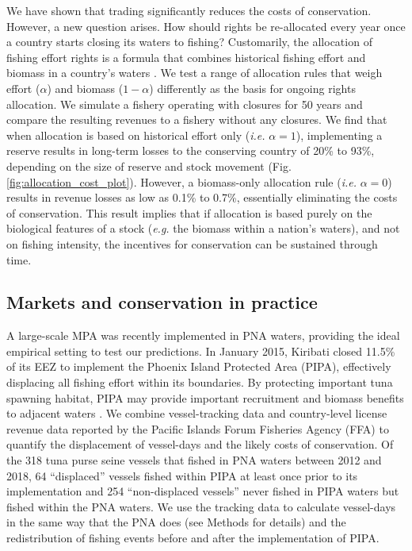 \documentclass[12pt]{article}
\begin{document}
We have shown that trading significantly reduces the costs of conservation. However, a new question arises. How should rights be re-allocated every year once a country starts closing its waters to fishing? Customarily, the allocation of fishing effort rights is a formula that combines historical fishing effort and biomass in a country's waters \cite{havice_2013}. We test a range of allocation rules that weigh effort ($\alpha$) and biomass ($1 - \alpha$) differently as the basis for ongoing rights allocation. We simulate a fishery operating with closures for 50 years and compare the resulting revenues to a fishery without any closures. We find that when allocation is based on historical effort only (\emph{i.e.} $\alpha = 1$), implementing a reserve results in long-term losses to the conserving country of 20\% to 93\%, depending on the size of reserve and stock movement (Fig. \ref{fig:allocation_cost_plot}). However, a biomass-only allocation rule (\emph{i.e.} $\alpha = 0$) results in revenue losses as low as 0.1\% to 0.7\%, essentially eliminating the costs of conservation. This result implies that if allocation is based purely on the biological features of a stock (\emph{e.g.} the biomass within a nation's waters), and not on fishing intensity, the incentives for conservation can be sustained through time.

\subsection{Markets and conservation in practice}

A large-scale MPA was recently implemented in PNA waters, providing the ideal empirical setting to test our predictions. In January 2015, Kiribati closed 11.5\% of its EEZ to implement the Phoenix Island Protected Area (PIPA), effectively displacing all fishing effort within its boundaries\cite{mccauley_2016,mcdermott_2018}. By protecting important tuna spawning habitat, PIPA may provide important recruitment and biomass benefits to adjacent waters \cite{hernndez_2019}. We combine vessel-tracking data \cite{kroodsma_2018} and country-level license revenue data reported by the Pacific Islands Forum Fisheries Agency (FFA) \cite{ffa_2017} to quantify the displacement of vessel-days and the likely costs of conservation. Of the 318 tuna purse seine vessels that fished in PNA waters between 2012 and 2018, 64 ``displaced'' vessels fished within PIPA at least once prior to its implementation and 254 ``non-displaced vessels'' never fished in PIPA waters but fished within the PNA waters. We use the tracking data to calculate vessel-days in the same way that the PNA does (see Methods for details) and the redistribution of fishing events before and after the implementation of PIPA.
\end{document}
